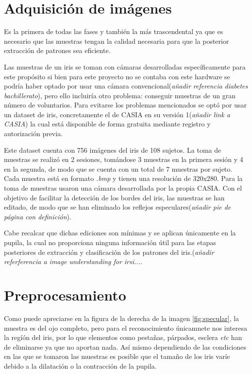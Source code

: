 \section{Adquisición de imágenes}
Es la primera de todas las fases y también la más trascendental ya que es necesario que las muestras tengan la calidad necesaria para que la posterior extracción de patrones sea eficiente.

Las muestras de un iris se toman con cámaras desarrolladas específicamente para este propósito si bien para este proyecto no se contaba con este hardware se podría haber optado por usar una cámara convencional(\emph{añadir referencia diabetes bachillerato}), pero ello incluiría otro problema: conseguir muestras de un gran número de voluntarios.
Para evitarse los problemas mencionados se optó por usar un dataset de iris, concretamente el de CASIA en su versión 1(\emph{añadir link a CASIA}) la cual está disponible de forma gratuita mediante registro y autorización previa.

Este dataset cuenta con 756 imágenes del iris de 108 sujetos. La toma de muestras se realizó en 2 sesiones, tomándose 3 muestras en la primera sesión y 4 en la segunda, de modo que se cuenta con un total de 7 muestras por sujeto.
Cada muestra está en formato \emph{.bmp} y tienen una resolución de 320x280.
Para la toma de muestras usaron una cámara desarrollada por la propia CASIA.
Con el objetivo de facilitar la detección de los bordes del iris, las muestras se han editado, de modo que se han eliminado los reflejos especulares(\emph{añadir pie de página con definición}).

Cabe recalcar que dichas ediciones son mínimas y se aplican únicamente en la pupila, la cual no proporciona ninguna información útil para las etapas posteriores de extracción y clasificación de los patrones del iris.(\emph{añadir referferencia a image understanding for irsi.... }

\section{Preprocesamiento}
Como puede apreciarse en la figura de la derecha de la imagen \ref{fig:specular}, la muestra es del ojo completo, pero para el reconocimiento únicamnete nos interesa la regíón del iris, por lo que elementos como pestañas, párpados, esclera \emph{etc} han de eliminarse ya que no aportan nada.
Así mismo dependiendo de las condiciones en las que se tomaron las muestras es posible que el tamaño de los iris varíe debido a la dilatación o la contracción de la pupila.

